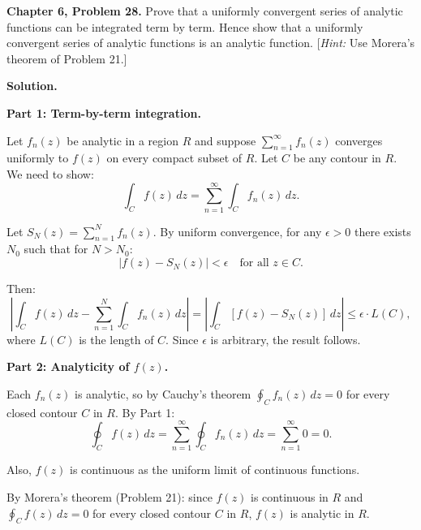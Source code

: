 \documentclass[12pt]{article}
\begin{document}
\textbf{Chapter 6, Problem 28.} Prove that a uniformly convergent series of analytic functions can be integrated term by term. Hence show that a uniformly convergent series of analytic functions is an analytic function. [\textit{Hint:} Use Morera's theorem of Problem 21.]

\bigskip
\textbf{Solution.}

\textbf{Part 1: Term-by-term integration.}

Let $f_n(z)$ be analytic in a region $R$ and suppose $\sum_{n=1}^{\infty} f_n(z)$ converges uniformly to $f(z)$ on every compact subset of $R$. Let $C$ be any contour in $R$. We need to show:
\[
\int_C f(z)\,dz = \sum_{n=1}^{\infty}\int_C f_n(z)\,dz.
\]

Let $S_N(z) = \sum_{n=1}^{N}f_n(z)$. By uniform convergence, for any $\epsilon > 0$ there exists $N_0$ such that for $N > N_0$:
\[
|f(z) - S_N(z)| < \epsilon \quad \text{for all } z \in C.
\]

Then:
\[
\left|\int_C f(z)\,dz - \sum_{n=1}^{N}\int_C f_n(z)\,dz\right| = \left|\int_C [f(z)-S_N(z)]\,dz\right| \leq \epsilon \cdot L(C),
\]
where $L(C)$ is the length of $C$. Since $\epsilon$ is arbitrary, the result follows.

\textbf{Part 2: Analyticity of $f(z)$.}

Each $f_n(z)$ is analytic, so by Cauchy's theorem $\oint_C f_n(z)\,dz = 0$ for every closed contour $C$ in $R$. By Part 1:
\[
\oint_C f(z)\,dz = \sum_{n=1}^{\infty}\oint_C f_n(z)\,dz = \sum_{n=1}^{\infty} 0 = 0.
\]

Also, $f(z)$ is continuous as the uniform limit of continuous functions.

By Morera's theorem (Problem 21): since $f(z)$ is continuous in $R$ and $\oint_C f(z)\,dz = 0$ for every closed contour $C$ in $R$, $f(z)$ is analytic in $R$.
\end{document}
